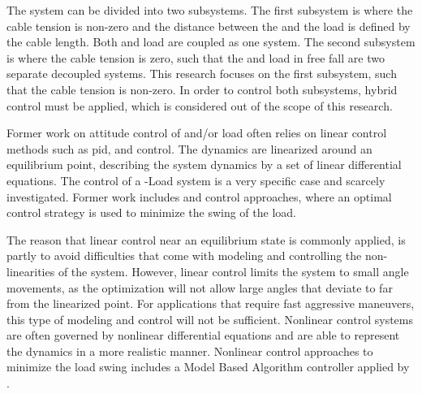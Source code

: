 The system can be divided into two subsystems. The first subsystem is where the cable tension is non-zero and the distance between the  and the load is defined by the cable length. Both  and load are coupled as one system. The second subsystem is where the cable tension is zero, such that the  and load in free fall are two separate decoupled systems. This research focuses on the first subsystem, such that the cable tension is non-zero. In order to control both subsystems, hybrid control must be applied, which is considered out of the scope of this research.

Former work on attitude control of  and/or load often relies on linear control methods such as \acs{pid},  and  control. The dynamics are linearized around an equilibrium point, describing the system dynamics by a set of linear differential equations. 
The control of a -Load system is a very specific case and scarcely investigated. Former work includes  \cite{PraveenThesis} and  control approaches, where an optimal control strategy is used to minimize the swing of the load. 

The reason that linear control near an equilibrium state is commonly applied, is partly to avoid difficulties that come with modeling and controlling the non-linearities of the system. However, linear control limits the system to small angle movements, as the optimization will not allow large angles that deviate to far from the linearized point. For applications that require fast aggressive maneuvers, this type of modeling and control will not be sufficient. 
Nonlinear control systems are often governed by nonlinear differential equations and are able to represent the dynamics in a more realistic manner. Nonlinear control approaches to minimize the load swing includes a Model Based Algorithm controller applied by \cite{Sadr2014}. 
%

